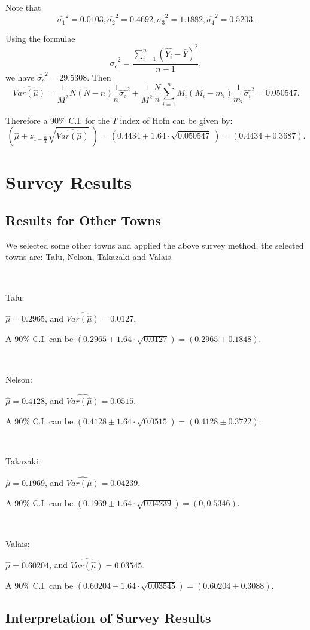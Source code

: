 \documentclass[12pt]{article}%
\begin{document}
Note that 
$$
\hat{\sigma_1}^2=0.0103, 
\hat{\sigma_2}^2=0.4692,
\hat{\sigma_3}^2=1.1882, 
\hat{\sigma_4}^2=0.5203.
$$

Using the formulae 
$$\hat{\sigma_c}^2=\frac{ \sum_{i=1}^n (\hat{Y_i} - \bar{Y})^2 }{n-1},$$
we have $\hat{\sigma_c}^2 = 29.5308.$ Then 
$$\widehat{Var(\hat{\mu})} 
= \frac{1}{M^2}N(N-n)\frac{1}{n}\hat{\sigma_c}^2
+\frac{1}{M^2}\frac{N}{n}\sum_{i=1}^{n}M_i(M_i-m_i)\frac{1}{m_i}\hat{\sigma_i}^2
=0.050547.$$

Therefore a 90\% C.I. for the $T$ index of Hofn can be given by: 
$$(\hat{\mu} \pm z_{1-\frac{\alpha}{2}}\sqrt{\widehat{Var(\hat{\mu})}}~)
=(0.4434 \pm 1.64\cdot \sqrt{0.050547}~)
=(0.4434 \pm 0.3687).$$

\section{Survey Results}
\subsection{Results for Other Towns}
We selected some other towns and applied the above survey method, 
the selected towns are: Talu, Nelson, Takazaki and Valais.

~\ 

Talu: 

$\hat{\mu}=0.2965$, and $\widehat{Var(\hat{\mu})}=0.0127.$ 

A 90\% C.I. can be $(0.2965 \pm 1.64\cdot \sqrt{0.0127} )=(0.2965 \pm 0.1848)$.

~\ 

Nelson: 

$\hat{\mu}=0.4128$, and $\widehat{Var(\hat{\mu})}=0.0515.$ 

A 90\% C.I. can be $(0.4128 \pm 1.64\cdot \sqrt{0.0515} )=(0.4128 \pm 0.3722)$.

~\ 

Takazaki: 

$\hat{\mu}=0.1969$, and $\widehat{Var(\hat{\mu})}=0.04239.$ 

A 90\% C.I. can be $(0.1969 \pm 1.64\cdot \sqrt{0.04239} )
=(0, 0.5346)$.

~\ 

Valais: 

$\hat{\mu}=0.60204$, and $\widehat{Var(\hat{\mu})}=0.03545.$ 

A 90\% C.I. can be $(0.60204 \pm 1.64\cdot \sqrt{0.03545} )
=(0.60204 \pm 0.3088)$.


\subsection{Interpretation of Survey Results}
\end{document}
